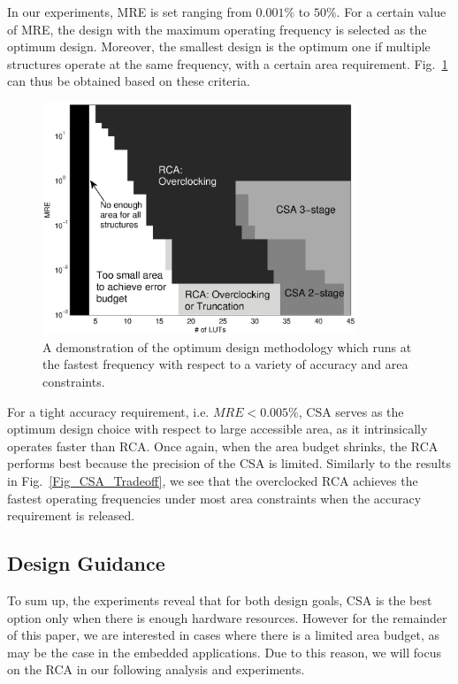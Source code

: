 \documentclass[journal]{IEEEtran}
\begin{document}
In our experiments, MRE is set ranging from $0.001\%$ to $50\%$. For a certain value of MRE, the design with the maximum operating frequency is selected as the optimum design. Moreover, the smallest design is the optimum one if multiple structures operate at the same frequency, with a certain area requirement. Fig.~\ref{Fig_CSA_Tradeoff_Error} can thus be obtained based on these criteria.
\begin{figure}[t]
    \centering
    \includegraphics[width=3.7in]{./Figures/Tradeoff_Error.eps}
    \caption{A demonstration of the optimum design methodology which runs at the fastest frequency with respect to a variety of accuracy and area constraints.}
    \label{Fig_CSA_Tradeoff_Error}
\end{figure}

For a tight accuracy requirement, i.e. $MRE<0.005\%$, CSA serves as the optimum design choice with respect to large accessible area, as it intrinsically operates faster than RCA. Once again, when the area budget shrinks, the RCA performs best because the precision of the CSA is limited. Similarly to the results in Fig.~\ref{Fig_CSA_Tradeoff}, we see that the overclocked RCA achieves the fastest operating frequencies under most area constraints when the accuracy requirement is released.

\subsection{Design Guidance}
To sum up, the experiments reveal that for both design goals, CSA is the best option only when there is enough hardware resources. However for the remainder of this paper, we are interested in cases where there is a limited area budget, as may be the case in the embedded applications. Due to this reason, we will focus on the RCA in our following analysis and experiments.
\end{document}
